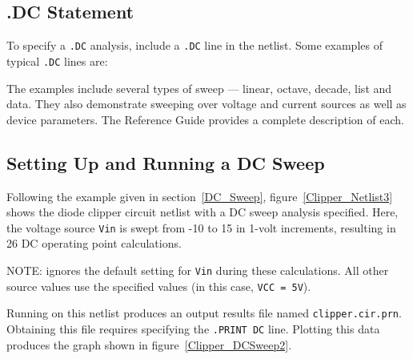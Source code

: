 \subsection{.DC Statement}

To specify a \verb|.DC| analysis, include a \verb|.DC| line in the netlist.  Some examples of typical \verb|.DC| lines are:


The examples include several types of sweep --- linear, octave,
decade, list and data.  They also demonstrate sweeping over voltage and current
sources as well as device parameters.  The \Xyce{} Reference
Guide\ReferenceGuide{} provides a complete description of each.

\subsection{Setting Up and Running a DC Sweep}
\label{Running_DC_Sweep}

Following the example given in section~\ref{DC_Sweep}, figure~\ref{Clipper_Netlist3} shows the diode clipper circuit netlist with a DC sweep analysis specified.  Here, the voltage source \texttt{Vin} is swept from -10 to 15 in 1-volt increments, resulting in 26 DC operating point calculations.  

NOTE:	\Xyce{} ignores the default setting for \texttt{Vin} during these calculations.  All other source values use the specified values (in this case, \texttt{VCC =  5V}).

Running \Xyce{} on this netlist produces an output results file named
\verb|clipper.cir.prn|.  Obtaining this file requires specifying the \verb|.PRINT DC| line. Plotting this data produces the graph shown in figure~\ref{Clipper_DCSweep2}.

